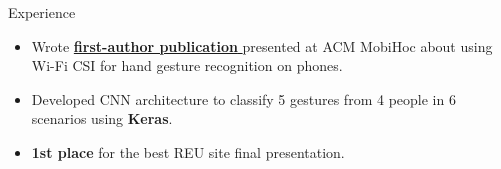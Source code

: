 \documentclass{resume} %
\begin{document}
\begin{workSection}{Experience}
    \experienceItem[
    company=Temple University,
    location=Philadelphia{,} PA,
    position=Undergraduate Research Intern,
    duration=June {-} July 2023
    ]
    \begin{itemize}
        \vspace{-0.5em}
        \itemsep -6pt {}
        \item Wrote
        \href{https://dl.acm.org/doi/10.1145/3565287.3617613}{\textbf{first-author publication} \faExternalLink} 
        presented at ACM MobiHoc about using Wi-Fi CSI for hand gesture recognition on phones.
        \item Developed CNN architecture to classify 5 gestures from 4 people in 6 scenarios using \textbf{Keras}. %
        \item \textbf{1st place} for the best REU site final presentation. %
    \end{itemize}

\end{workSection}
\end{document}
